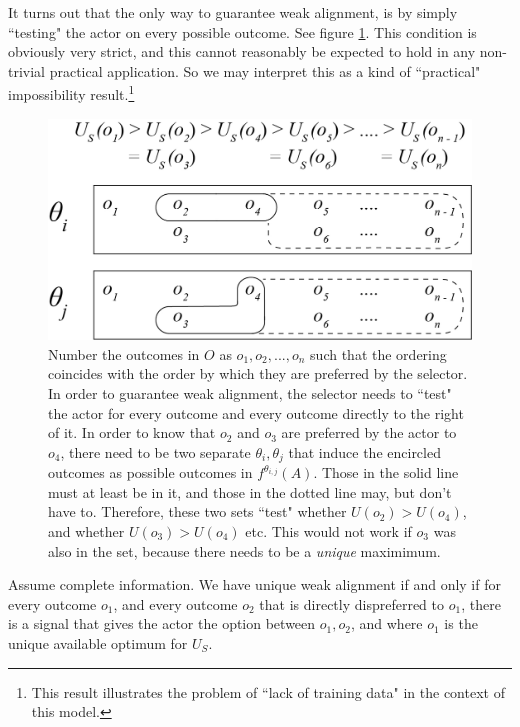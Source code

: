 It turns out that the only way to guarantee weak alignment, is by simply ``testing" the actor on every possible outcome. See figure \ref{fig:theorem2illustration}. This condition is obviously very strict, and this cannot reasonably be expected to hold in any non-trivial practical application. So we may interpret this as a kind of ``practical" impossibility result.\footnote{This result illustrates the problem of ``lack of training data" in the context of this model. } 

\def\geqdot{\mathrel{<\kern-.65em\raise.01ex\hbox{$\boldsymbol{\cdot}$}}}
\def\notgeqdot{\mathrel{\not <\kern-.65em\raise.01ex\hbox{$\boldsymbol{\cdot}$}}}
\def\precdot{\mathrel{\prec\kern-.55em\raise.01ex\hbox{$\boldsymbol{\cdot}$}}}




\begin{figure}[H]
	\centering
	\captionsetup{labelfont=bf,font=small,labelsep=period}
	\includegraphics[width=0.7\linewidth]{"images/theorem-examples/theorem2illustration"}
	\caption{\rightskip=20pt\leftskip=20pt Number the outcomes in $O$ as $o_1,o_2,...,o_n$ such that the ordering coincides with the order by which they are preferred by the selector. In order to guarantee weak alignment, the selector needs to ``test" the actor for every outcome and every outcome directly to the right of it. In order to know that $o_2$ and $o_3$ are preferred by the actor to $o_4$, there need to be two separate $\theta_i,\theta_j$ that induce the encircled outcomes as possible outcomes in $f^{\theta_{i,j}}(A)$. Those in the solid line must at least be in it, and those in the dotted line may, but don't have to. Therefore, these two sets ``test"  whether $U(o_2)>U(o_4)$, and whether $U(o_3)> U(o_4)$ etc. This would not work if $o_3$ was also in the set, because there needs to be a \textit{unique} maximimum.}
	\label{fig:theorem2illustration} 	
\end{figure}

\newcommand{\theoremguaranteedalignment}{
	Assume complete information. We have unique weak alignment if and only if for every outcome $o_1$, and every outcome $o_2$ that is directly dispreferred to $o_1$, there is a signal that gives the actor the option between $o_1,o_2$, and where $o_1$ is the unique available optimum for $U_S$.
}
\begin{theorem}\label{theorem:guaranteedalignment}
	\theoremguaranteedalignment
	
\end{theorem}

